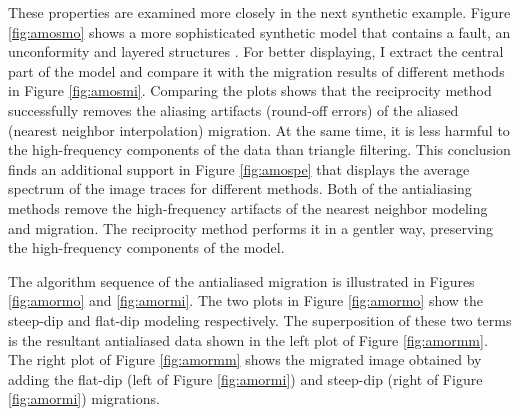 These properties are examined more closely in the next synthetic
example. Figure \ref{fig:amosmo} shows a more sophisticated synthetic
model that contains a fault, an unconformity and layered structures
\cite{Claerbout.bei.95}. For better displaying, I extract the central
part of the model and compare it with the migration results of
different methods in Figure \ref{fig:amosmi}. Comparing the plots
shows that the reciprocity method successfully removes the aliasing
artifacts (round-off errors) of the aliased (nearest neighbor
interpolation) migration.  At the same time, it is less harmful to the
high-frequency components of the data than triangle filtering. This
conclusion finds an additional support in Figure \ref{fig:amospe} that
displays the average spectrum of the image traces for different
methods. Both of the antialiasing methods remove the high-frequency
artifacts of the nearest neighbor modeling and migration. The
reciprocity method performs it in a gentler way, preserving the
high-frequency components of the model.




The algorithm sequence of the antialiased migration is illustrated in
Figures \ref{fig:amormo} and \ref{fig:amormi}. The two plots in Figure
\ref{fig:amormo} show the steep-dip and flat-dip modeling respectively. The
superposition of these two terms is the resultant antialiased data
shown in the left plot of Figure \ref{fig:amormm}. The right plot of
Figure \ref{fig:amormm} shows the migrated image obtained by adding the
flat-dip (left of Figure \ref{fig:amormi}) and steep-dip (right of Figure
\ref{fig:amormi}) migrations.


